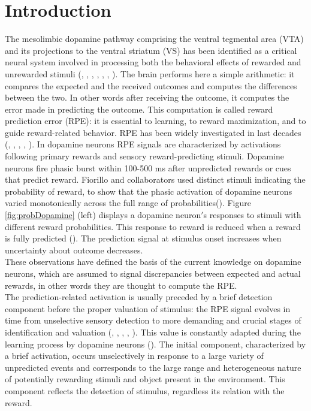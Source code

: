 \chapter{Introduction}
\label{chap:Introduction}
The mesolimbic dopamine pathway comprising the ventral tegmental area (VTA) and its projections to the ventral striatum (VS) has been identified as a critical neural system involved in processing both the behavioral effects of rewarded and unrewarded stimuli (\cite{Schultz1992}, \cite{Montague}, \cite{Ungless2004}, \cite{Sun2014}, \cite{Tobler2003}, \cite{UchidaDop1}, \cite{Takahashi2016}). The brain performs here a simple arithmetic: it compares the expected and the received outcomes and computes the differences between the two. In other words after receiving the outcome, it computes the error made in predicting the outcome. This computation is called reward prediction  error (RPE): it is essential to learning, to reward maximization, and to guide reward-related behavior. RPE has been widely investigated in last decades (\cite{Schultz1997}, \cite{UchidaDop}, \cite{Fiorillo}, \cite{Pagnoni}, \cite{Schultz2016}). In dopamine neurons RPE signals are characterized by activations following primary rewards and sensory reward-predicting stimuli. Dopamine neurons fire phasic burst within 100-500 ms after unpredicted rewards or cues that predict reward. Fiorillo and collaborators used distinct stimuli indicating the probability of reward, to show that the phasic activation of dopamine neurons varied monotonically across the full range of probabilities(\cite{Fiorillo}). Figure \ref{fig:probDopamine} (left) displays a dopamine neuron$'$s responses to stimuli with different reward probabilities. This response to reward is reduced when a reward is fully predicted (\cite{Uchida}). The prediction signal at stimulus onset increases when uncertainty about outcome decreases.\\These observations have defined the basis of the current knowledge on dopamine neurons, which are assumed to signal discrepancies between expected and actual rewards, in other words they are thought to compute the RPE.\\The prediction-related activation is usually preceded by a brief detection component before the proper valuation of stimulus: the RPE signal evolves in time from unselective sensory detection to more demanding and crucial stages of identification and valuation (\cite{Tobler2003}, \cite{Nomoto2010}, \cite{Fiorillo2013}, \cite{deLafuente}, \cite{Schultz2016}). This value is constantly adapted during the learning process by dopamine neurons (\cite{Tobler2005}). The initial component, characterized by a brief activation, occurs unselectively in response to a large variety of unpredicted events and corresponds to the large range and heterogeneous nature of potentially rewarding stimuli and object present in the environment. This component reflects the detection of stimulus, regardless its relation with the reward.

